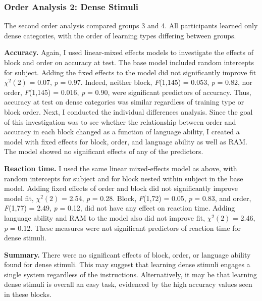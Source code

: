 \documentclass[../dissertation.tex]{subfiles}
\begin{document}
\subsubsection{Order Analysis 2: Dense Stimuli}
	The second order analysis compared groups 3 and 4. All participants learned only dense categories, with the order of learning types differing between groups. \par
	\textbf{Accuracy.} Again, I used linear-mixed effects models to investigate the effects of block and order on accuracy at test. The base model included random intercepts for subject. Adding the fixed effects to the model did not significantly improve fit $\chi^{2}(2)$ = 0.07,  \textit{p} = 0.97. Indeed, neither block, \textit{F}(1,145) = 0.053, \textit{p} = 0.82, nor order, \textit{F}(1,145) = 0.016, \textit{p} = 0.90, were significant predictors of accuracy. Thus, accuracy at test on dense categories was similar regardless of training type or block order.
	Next, I conducted the individual differences analysis. Since the goal of this investigation was to see whether the relationship between order and accuracy in each block changed as a function of language ability, I created a model with fixed effects for block, order, and language ability as well as RAM. The model showed no significant effects of any of the predictors. \par 
	\textbf{Reaction time.} I used the same linear mixed-effects model as above, with random intercepts for subject and for block nested within subject in the base model. Adding fixed effects of order and block did not significantly improve model fit, $\chi^{2}(2)$ = 2.54, \textit{p} = 0.28. Block, \textit{F}(1,72) = 0.05, \textit{p} = 0.83, and order, \textit{F}(1,77) = 2.49, \textit{p} = 0.12, did not have any effect on reaction time. Adding language ability and RAM to the model also did not improve fit, $\chi^{2}(2)$ = 2.46, \textit{p} = 0.12. These measures were not significant predictors of reaction time for dense stimuli.\par
	\textbf{Summary.} There were no significant effects of block, order, or language ability found for dense stimuli. This may suggest that learning dense stimuli engages a single system regardless of the instructions. Alternatively, it may be that learning dense stimuli is overall an easy task, evidenced by the high accuracy values seen in these blocks.
	
\end{document}
